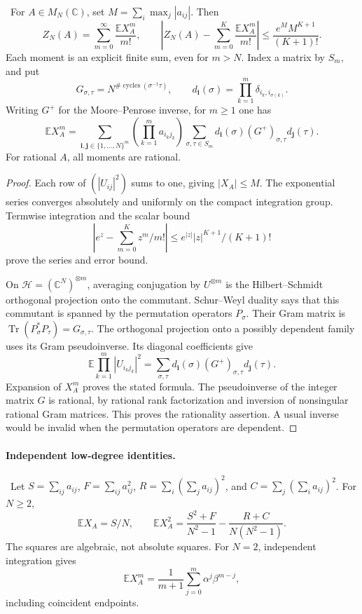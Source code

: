 \begin{proposition}\ours\ 
For \(A\in M_N(\mathbb C)\), set
\(M=\sum_i\max_j|a_{ij}|\). Then
\[
 Z_N(A)=\sum_{m=0}^\infty\frac{\mathbb E X_A^m}{m!},\qquad
 \left|Z_N(A)-\sum_{m=0}^K\frac{\mathbb E X_A^m}{m!}\right|
 \leq\frac{e^M M^{K+1}}{(K+1)!}.
\]
Each moment is an explicit finite sum, even for \(m>N\).
Index a matrix by \(S_m\), and put
\[
 G_{\sigma,\tau}=N^{\#\operatorname{cycles}(\sigma^{-1}\tau)},\qquad
 d_{\boldsymbol i}(\sigma)=
     \prod_{k=1}^m\delta_{i_k,i_{\sigma(k)}}.
\]
Writing \(G^+\) for the Moore--Penrose inverse, for \(m\geq1\) one has
\[
 \mathbb E X_A^m=
 \sum_{\boldsymbol i,\boldsymbol j\in\{1,\ldots,N\}^m}
 \left(\prod_{k=1}^m a_{i_kj_k}\right)
 \sum_{\sigma,\tau\in S_m}
 d_{\boldsymbol i}(\sigma)(G^+)_{\sigma,\tau}
 d_{\boldsymbol j}(\tau).
\]
For rational \(A\), all moments are rational.
\end{proposition}
\begin{proof}
Each row of \((|U_{ij}|^2)\) sums to one, giving \(|X_A|\leq M\).
The exponential series converges absolutely and uniformly on the
compact integration group. Termwise integration and the scalar bound
\[
 \left|e^z-\sum_{m=0}^Kz^m/m!\right|
 \leq e^{|z|}|z|^{K+1}/(K+1)!
\]
prove the series and error bound.

On \(\mathcal H=(\mathbb C^N)^{\otimes m}\), averaging conjugation
by \(U^{\otimes m}\) is the Hilbert--Schmidt orthogonal projection
onto the commutant. Schur--Weyl duality says that this commutant is
spanned by the permutation operators \(P_\sigma\).
Their Gram matrix is
\(\operatorname{Tr}(P_\sigma^\ast P_\tau)=G_{\sigma,\tau}\).
The orthogonal projection onto a possibly dependent family uses its
Gram pseudoinverse. Its diagonal coefficients give
\[
 \mathbb E\prod_{k=1}^m|U_{i_kj_k}|^2
 =\sum_{\sigma,\tau}
 d_{\boldsymbol i}(\sigma)(G^+)_{\sigma,\tau}
 d_{\boldsymbol j}(\tau).
\]
Expansion of \(X_A^m\) proves the stated formula.
The pseudoinverse of the integer matrix \(G\) is rational, by
rational rank factorization and inversion of nonsingular rational
Gram matrices. This proves the rationality assertion. A usual
inverse would be invalid when the permutation operators are
dependent.
\end{proof}

\paragraph{Independent low-degree identities.}\ours\ 
Let \(S=\sum_{ij}a_{ij}\), \(F=\sum_{ij}a_{ij}^2\),
\(R=\sum_i(\sum_j a_{ij})^2\), and
\(C=\sum_j(\sum_i a_{ij})^2\). For \(N\geq2\),
\[
 \mathbb EX_A=S/N,\qquad
 \mathbb EX_A^2=
 \frac{S^2+F}{N^2-1}-\frac{R+C}{N(N^2-1)}.
\]
The squares are algebraic, not absolute squares.
For \(N=2\), independent integration gives
\[
 \mathbb EX_A^m=\frac1{m+1}\sum_{j=0}^m\alpha^j\beta^{m-j},
\]
including coincident endpoints.

